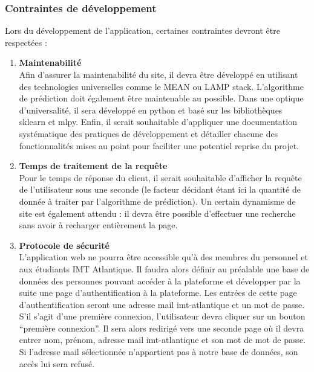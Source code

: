 \documentclass[oneside,a4paper,13pt]{article}
\begin{document}
\subsubsection {Contraintes de développement}

Lors du développement de l’application, certaines contraintes devront être respectées : 

\begin{enumerate}
    \item \textbf{Maintenabilité}\\
    Afin d’assurer la maintenabilité du site, il devra être développé en utilisant des technologies universelles comme le MEAN ou LAMP stack.
    L’algorithme de prédiction doit également être maintenable au possible. Dans une optique d’universalité, il sera développé en python et basé sur les bibliothèques sklearn et mlpy. 
    Enfin, il serait souhaitable d’appliquer une documentation systématique des pratiques de développement et détailler chacune des fonctionnalités mises au point pour faciliter une potentiel reprise du projet. 
    
    \item \textbf{Temps de traitement de la requête}\\
    Pour le temps de réponse du client, il serait souhaitable d’afficher la requête de l’utilisateur sous une seconde (le facteur décidant étant ici la quantité de donnée à traiter par l’algorithme de prédiction). 
Un certain dynamisme de site est également attendu : il devra être possible d’effectuer une recherche sans avoir à recharger entièrement la page.

    \item \textbf{Protocole de sécurité}\\
    L’application web ne pourra être accessible qu’à des membres du personnel et aux étudiants IMT Atlantique. Il faudra alors définir au préalable une base de données des personnes pouvant accéder à la plateforme et développer par la suite une page d’authentification à la plateforme. Les entrées de cette page d’authentification seront une adresse mail imt-atlantique et un mot de passe. S’il s’agit d’une première connexion, l'utilisateur devra cliquer sur un bouton “première connexion”. Il sera alors redirigé vers une seconde page où il devra entrer nom, prénom, adresse mail imt-atlantique et son mot de mot de passe. Si l’adresse mail sélectionnée n’appartient pas à notre base de données, son accès lui sera refusé. 
\end{enumerate}
\end{document}
